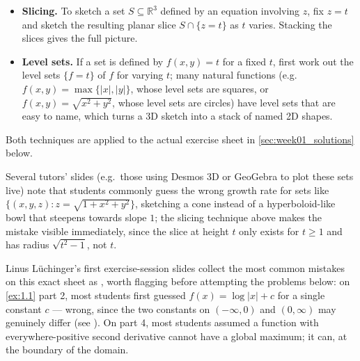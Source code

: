 \begin{itemize}
  \item \textbf{Slicing.} To sketch a set $S \subseteq \mathbb{R}^3$ defined by an equation
    involving $z$, fix $z = t$ and sketch the resulting planar slice $S \cap \{z = t\}$ as $t$
    varies. Stacking the slices gives the full picture.
  \item \textbf{Level sets.} If a set is defined by $f(x,y) = t$ for a fixed $t$, first work out
    the level sets $\{f = t\}$ of $f$ for varying $t$; many natural functions (e.g.
    $f(x,y) = \max\{|x|,|y|\}$, whose level sets are squares, or $f(x,y) = \sqrt{x^2+y^2}$, whose
    level sets are circles) have level sets that are easy to name, which turns a 3D sketch into a
    stack of named 2D shapes.
\end{itemize}

Both techniques are applied to the actual exercise sheet in \cref{sec:week01_solutions} below.

\begin{remark}
Several tutors' slides (e.g.\ those using Desmos 3D or GeoGebra to plot these sets live) note that
students commonly guess the wrong growth rate for sets like
$\{(x,y,z) : z = \sqrt{1+x^2+y^2}\}$, sketching a cone instead of a hyperboloid-like bowl that
steepens towards slope $1$; the slicing technique above makes the mistake visible immediately, since the slice
at height $t$ only exists for $t \geq 1$ and has radius $\sqrt{t^2-1}$, not $t$.
\end{remark}


\begin{ainote}
Linus Lüchinger's first exercise-session slides collect the most common mistakes on this exact
sheet as , worth flagging before attempting the problems below: on \cref{ex:1.1} part 2,
most students first guessed $f(x) = \log|x| + c$ for a single constant $c$ --- wrong, since the
two constants on $(-\infty,0)$ and $(0,\infty)$ may genuinely differ (see
). On part 4, most students assumed a function with everywhere-positive
second derivative cannot have a global maximum; it can, at the boundary of the domain.
\end{ainote}

